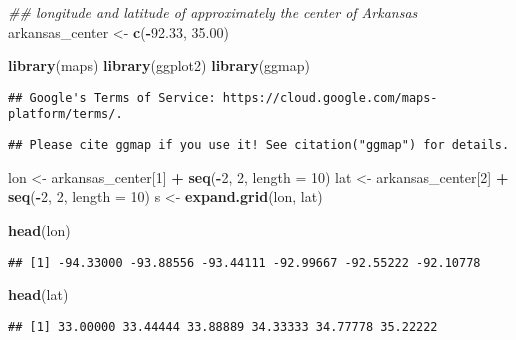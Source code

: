 \documentclass[]{book}
\newenvironment{Shaded}{\begin{snugshade}}{\end{snugshade}}
\newcommand{\CommentTok}[1]{\textcolor[rgb]{0.56,0.35,0.01}{\textit{#1}}}
\newcommand{\DataTypeTok}[1]{\textcolor[rgb]{0.13,0.29,0.53}{#1}}
\newcommand{\DecValTok}[1]{\textcolor[rgb]{0.00,0.00,0.81}{#1}}
\newcommand{\FloatTok}[1]{\textcolor[rgb]{0.00,0.00,0.81}{#1}}
\newcommand{\KeywordTok}[1]{\textcolor[rgb]{0.13,0.29,0.53}{\textbf{#1}}}
\newcommand{\NormalTok}[1]{#1}
\newcommand{\OperatorTok}[1]{\textcolor[rgb]{0.81,0.36,0.00}{\textbf{#1}}}
\newcommand{\StringTok}[1]{\textcolor[rgb]{0.31,0.60,0.02}{#1}}
\begin{document}
\begin{Shaded}
\begin{Highlighting}[]
\CommentTok{## longitude and latitude of approximately the center of Arkansas}
\NormalTok{arkansas_center <-}\StringTok{ }\KeywordTok{c}\NormalTok{(}\OperatorTok{-}\FloatTok{92.33}\NormalTok{, }\FloatTok{35.00}\NormalTok{) }

\KeywordTok{library}\NormalTok{(maps)}
\KeywordTok{library}\NormalTok{(ggplot2)}
\KeywordTok{library}\NormalTok{(ggmap)}
\end{Highlighting}
\end{Shaded}

\begin{verbatim}
## Google's Terms of Service: https://cloud.google.com/maps-platform/terms/.
\end{verbatim}

\begin{verbatim}
## Please cite ggmap if you use it! See citation("ggmap") for details.
\end{verbatim}

\begin{Shaded}
\begin{Highlighting}[]
\NormalTok{lon <-}\StringTok{ }\NormalTok{arkansas_center[}\DecValTok{1}\NormalTok{] }\OperatorTok{+}\StringTok{ }\KeywordTok{seq}\NormalTok{(}\OperatorTok{-}\DecValTok{2}\NormalTok{, }\DecValTok{2}\NormalTok{, }\DataTypeTok{length =} \DecValTok{10}\NormalTok{)   }
\NormalTok{lat <-}\StringTok{ }\NormalTok{arkansas_center[}\DecValTok{2}\NormalTok{] }\OperatorTok{+}\StringTok{ }\KeywordTok{seq}\NormalTok{(}\OperatorTok{-}\DecValTok{2}\NormalTok{, }\DecValTok{2}\NormalTok{, }\DataTypeTok{length =} \DecValTok{10}\NormalTok{)   }
\NormalTok{s   <-}\StringTok{ }\KeywordTok{expand.grid}\NormalTok{(lon, lat)}

\KeywordTok{head}\NormalTok{(lon)}
\end{Highlighting}
\end{Shaded}

\begin{verbatim}
## [1] -94.33000 -93.88556 -93.44111 -92.99667 -92.55222 -92.10778
\end{verbatim}

\begin{Shaded}
\begin{Highlighting}[]
\KeywordTok{head}\NormalTok{(lat) }
\end{Highlighting}
\end{Shaded}

\begin{verbatim}
## [1] 33.00000 33.44444 33.88889 34.33333 34.77778 35.22222
\end{verbatim}
\end{document}

